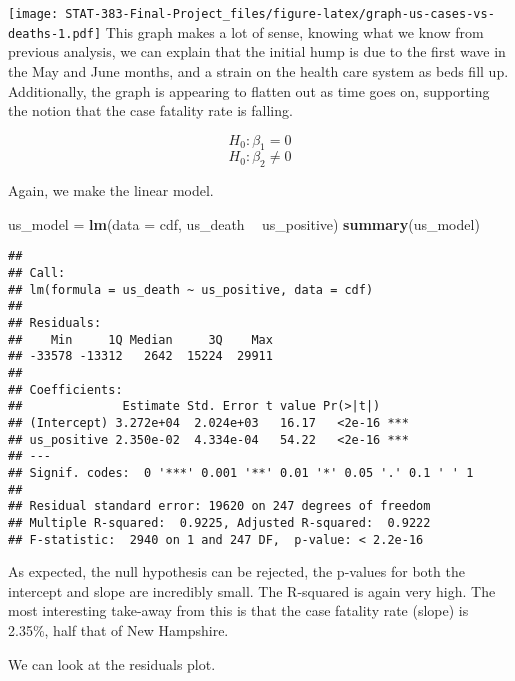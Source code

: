 \documentclass[
]{article}
\newenvironment{Shaded}{\begin{snugshade}}{\end{snugshade}}
\newcommand{\DataTypeTok}[1]{\textcolor[rgb]{0.13,0.29,0.53}{#1}}
\newcommand{\DecValTok}[1]{\textcolor[rgb]{0.00,0.00,0.81}{#1}}
\newcommand{\KeywordTok}[1]{\textcolor[rgb]{0.13,0.29,0.53}{\textbf{#1}}}
\newcommand{\NormalTok}[1]{#1}
\newcommand{\OperatorTok}[1]{\textcolor[rgb]{0.81,0.36,0.00}{\textbf{#1}}}
\newcommand{\StringTok}[1]{\textcolor[rgb]{0.31,0.60,0.02}{#1}}
\begin{document}
\texttt{[image: STAT-383-Final-Project\_files/figure-latex/graph-us-cases-vs-deaths-1.pdf]}
This graph makes a lot of sense, knowing what we know from previous
analysis, we can explain that the initial hump is due to the first wave
in the May and June months, and a strain on the health care system as
beds fill up. Additionally, the graph is appearing to flatten out as
time goes on, supporting the notion that the case fatality rate is
falling.

\[H_{0}: \beta_{1} = 0\] \[H_{0}: \beta_{2} \neq 0\]

Again, we make the linear model.

\begin{Shaded}
\begin{Highlighting}[]
\NormalTok{us_model =}\StringTok{ }\KeywordTok{lm}\NormalTok{(}\DataTypeTok{data =}\NormalTok{ cdf, us_death }\OperatorTok{~}\StringTok{ }\NormalTok{us_positive)}
\KeywordTok{summary}\NormalTok{(us_model)}
\end{Highlighting}
\end{Shaded}

\begin{verbatim}
## 
## Call:
## lm(formula = us_death ~ us_positive, data = cdf)
## 
## Residuals:
##    Min     1Q Median     3Q    Max 
## -33578 -13312   2642  15224  29911 
## 
## Coefficients:
##              Estimate Std. Error t value Pr(>|t|)    
## (Intercept) 3.272e+04  2.024e+03   16.17   <2e-16 ***
## us_positive 2.350e-02  4.334e-04   54.22   <2e-16 ***
## ---
## Signif. codes:  0 '***' 0.001 '**' 0.01 '*' 0.05 '.' 0.1 ' ' 1
## 
## Residual standard error: 19620 on 247 degrees of freedom
## Multiple R-squared:  0.9225, Adjusted R-squared:  0.9222 
## F-statistic:  2940 on 1 and 247 DF,  p-value: < 2.2e-16
\end{verbatim}

As expected, the null hypothesis can be rejected, the p-values for both
the intercept and slope are incredibly small. The R-squared is again
very high. The most interesting take-away from this is that the case
fatality rate (slope) is 2.35\%, half that of New Hampshire.

We can look at the residuals plot.

\begin{Shaded}
\end{Shaded}
\end{document}
